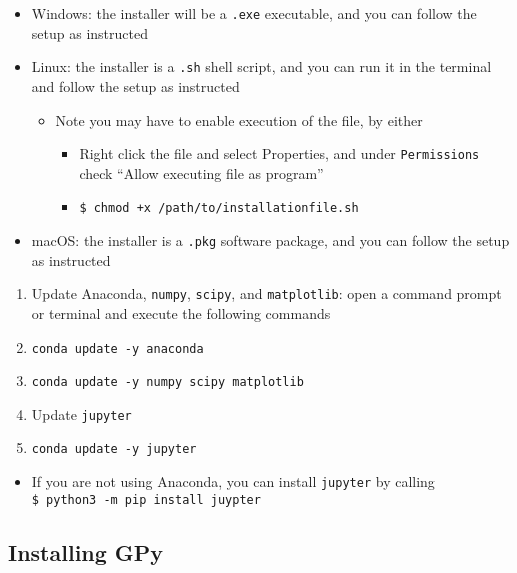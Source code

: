 \documentclass[11pt]{article}
\providecommand{\tightlist}{%
      \setlength{\itemsep}{0pt}\setlength{\parskip}{0pt}}
\begin{document}
\begin{itemize}
\tightlist
\item
  Windows: the installer will be a \texttt{.exe} executable, and you can
  follow the setup as instructed
\item
  Linux: the installer is a \texttt{.sh} shell script, and you can run
  it in the terminal and follow the setup as instructed

  \begin{itemize}
  \tightlist
  \item
    Note you may have to enable execution of the file, by either

    \begin{itemize}
    \tightlist
    \item
      Right click the file and select Properties, and under
      \texttt{Permissions} check ``Allow executing file as program''
    \item
      \texttt{\$\ chmod\ +x\ /path/to/installationfile.sh}
    \end{itemize}
  \end{itemize}
\item
  macOS: the installer is a \texttt{.pkg} software package, and you can
  follow the setup as instructed
\end{itemize}

\begin{enumerate}
\def\labelenumi{\arabic{enumi}.}
\tightlist
\item
  Update Anaconda, \texttt{numpy}, \texttt{scipy}, and
  \texttt{matplotlib}: open a command prompt or terminal and execute the
  following commands
\item
  \texttt{conda\ update\ -y\ anaconda}
\item
  \texttt{conda\ update\ -y\ numpy\ scipy\ matplotlib}
\item
  Update \texttt{jupyter}
\item
  \texttt{conda\ update\ -y\ jupyter}
\end{enumerate}

\begin{itemize}
\tightlist
\item
  If you are not using Anaconda, you can install \texttt{jupyter} by
  calling \texttt{\$\ python3\ -m\ pip\ install\ juypter}
\end{itemize}

\hypertarget{installing-gpy}{%
\subsection{Installing GPy}\label{installing-gpy}}
\end{document}

